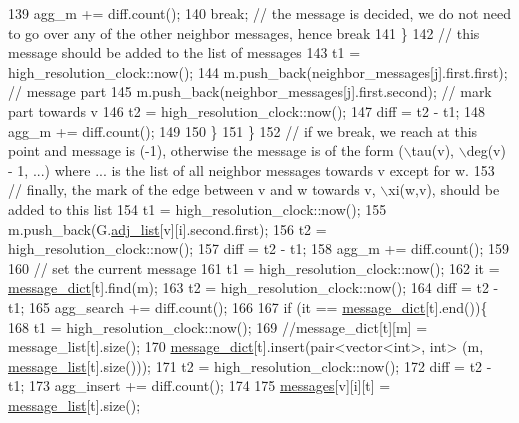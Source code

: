 \begin{DoxyCode}
139                 agg\_m += diff.count();
140                 \textcolor{keywordflow}{break}; \textcolor{comment}{// the message is decided, we do not need to go over any of the other neighbor
       messages, hence break}
141               \}
142               \textcolor{comment}{// this message should be added to the list of messages}
143               t1 = high\_resolution\_clock::now();
144               m.push\_back(neighbor\_messages[j].first.first); \textcolor{comment}{// message part}
145               m.push\_back(neighbor\_messages[j].first.second); \textcolor{comment}{// mark part towards v}
146               t2 = high\_resolution\_clock::now();
147               diff = t2 - t1;
148               agg\_m += diff.count();
149 
150             \}
151           \}
152           \textcolor{comment}{// if we break, we reach at this point and message is (-1), otherwise the message is of the form
       (\(\backslash\)tau(v), \(\backslash\)deg(v) - 1, ...) where ... is the list of all neighbor messages towards v except for w. }
153           \textcolor{comment}{// finally, the mark of the edge between v and w towards v, \(\backslash\)xi(w,v), should be added to this
       list}
154           t1 = high\_resolution\_clock::now();
155           m.push\_back(G.\hyperlink{classmarked__graph_a1a0bf7ca413a278763f7c878b3b6fd6f}{adj\_list}[v][i].second.first);
156           t2 = high\_resolution\_clock::now();
157           diff = t2 - t1;
158           agg\_m += diff.count();
159 
160           \textcolor{comment}{// set the current message}
161           t1 = high\_resolution\_clock::now();
162           it = \hyperlink{classgraph__message_ab54d89b122c2b1322da0d5db2043fb84}{message\_dict}[t].find(m);
163           t2 = high\_resolution\_clock::now();
164           diff = t2 - t1;
165           agg\_search += diff.count();
166 
167           \textcolor{keywordflow}{if} (it == \hyperlink{classgraph__message_ab54d89b122c2b1322da0d5db2043fb84}{message\_dict}[t].end())\{
168             t1 = high\_resolution\_clock::now();
169             \textcolor{comment}{//message\_dict[t][m] = message\_list[t].size();}
170             \hyperlink{classgraph__message_ab54d89b122c2b1322da0d5db2043fb84}{message\_dict}[t].insert(pair<vector<int>, \textcolor{keywordtype}{int}> (m, 
      \hyperlink{classgraph__message_aa17fdb629b423343edfafa97252763ef}{message\_list}[t].size()));
171             t2 = high\_resolution\_clock::now();
172             diff = t2 - t1;
173             agg\_insert += diff.count();
174 
175             \hyperlink{classgraph__message_aac77e098f0acf9650116a8e51fe3b4b7}{messages}[v][i][t] = \hyperlink{classgraph__message_aa17fdb629b423343edfafa97252763ef}{message\_list}[t].size();

\end{DoxyCode}
